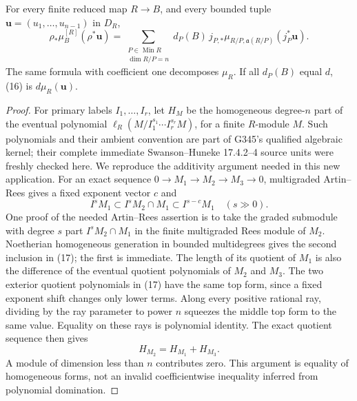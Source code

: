 \begin{theorem}
For every finite reduced map \(R\to B\), and every bounded tuple
\(\boldsymbol u=(u_1,\ldots,u_{n-1})\) in \(D_R\),
\[
 \rho_*\mu_B^{[R]}(\rho^*\boldsymbol u)
  =\sum_{\substack{P\in\operatorname{Min}R\\\dim R/P=n}}
       d_P(B)\,j_{P,*}\mu_{R/P,\mathfrak a(R/P)}
                                  (j_P^*\boldsymbol u).        \tag{16}
\]
The same formula with coefficient one decomposes \(\mu_R\).
If all \(d_P(B)\) equal \(d\), (16) is \(d\mu_R(\boldsymbol u)\).
\end{theorem}
\begin{proof}
For primary labels \(I_1,\ldots,I_r\), let \(H_M\) be the homogeneous
degree-\(n\) part of the eventual polynomial
\(\ell_R(M/I_1^{s_1}\cdots I_r^{s_r}M)\), for a finite \(R\)-module
\(M\). Such polynomials and their ambient convention are part of
G345's qualified algebraic kernel; their complete immediate
Swanson--Huneke 17.4.2--4 source units were freshly checked here.
We reproduce the additivity argument needed in this new application.
For an exact sequence \(0\to M_1\to M_2\to M_3\to0\),
multigraded Artin--Rees gives a fixed exponent vector \(c\) and
\[
 I^sM_1\subset I^sM_2\cap M_1\subset I^{s-c}M_1\quad(s\gg0).
 \tag{17}
\]
One proof of the needed Artin--Rees assertion is to take the graded
submodule with degree \(s\) part \(I^sM_2\cap M_1\) in the finite
multigraded Rees module of \(M_2\). Noetherian homogeneous generation
in bounded multidegrees gives the second inclusion in (17); the
first is immediate. The length of its quotient of \(M_1\) is also
the difference of the eventual quotient polynomials of \(M_2\)
and \(M_3\). The two exterior quotient polynomials in (17) have
the same top form, since a fixed exponent shift changes only
lower terms. Along every positive rational ray, dividing by the
ray parameter to power \(n\) squeezes the middle top form to the
same value. Equality on these rays is polynomial identity.
The exact quotient sequence then gives
\[
 H_{M_2}=H_{M_1}+H_{M_3}.                                    \tag{18}
\]
A module of dimension less than \(n\) contributes zero.
This argument is equality of homogeneous forms, not an invalid
coefficientwise inequality inferred from polynomial domination.


\end{proof}
